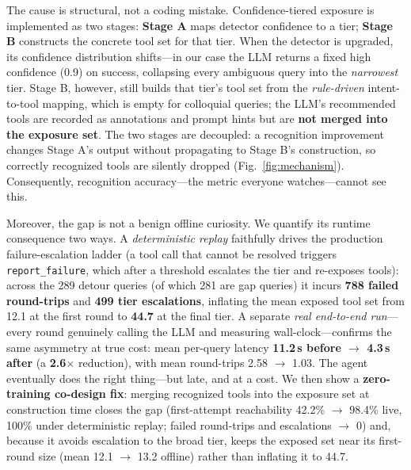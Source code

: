 The cause is structural, not a coding mistake. Confidence-tiered exposure is implemented as two stages: \textbf{Stage A} maps detector confidence to a tier; \textbf{Stage B} constructs the concrete tool set for that tier. When the detector is upgraded, its confidence distribution shifts---in our case the LLM returns a fixed high confidence (0.9) on success, collapsing every ambiguous query into the \emph{narrowest} tier. Stage B, however, still builds that tier's tool set from the \emph{rule-driven} intent-to-tool mapping, which is empty for colloquial queries; the LLM's recommended tools are recorded as annotations and prompt hints but are \textbf{not merged into the exposure set}. The two stages are decoupled: a recognition improvement changes Stage A's output without propagating to Stage B's construction, so correctly recognized tools are silently dropped (Fig.~\ref{fig:mechanism}). Consequently, recognition accuracy---the metric everyone watches---cannot see this.

Moreover, the gap is not a benign offline curiosity. We quantify its runtime consequence two ways. A \emph{deterministic replay} faithfully drives the production failure-escalation ladder (a tool call that cannot be resolved triggers \texttt{report\_failure}, which after a threshold escalates the tier and re-exposes tools): across the 289 detour queries (of which 281 are gap queries) it incurs \textbf{788 failed round-trips} and \textbf{499 tier escalations}, inflating the mean exposed tool set from 12.1 at the first round to \textbf{44.7} at the final tier. A separate \emph{real end-to-end run}---every round genuinely calling the LLM and measuring wall-clock---confirms the same asymmetry at true cost: mean per-query latency \textbf{11.2\,s before $\rightarrow$ 4.3\,s after} (a \textbf{2.6$\times$} reduction), with mean round-trips 2.58 $\rightarrow$ 1.03. The agent eventually does the right thing---but late, and at a cost. We then show a \textbf{zero-training co-design fix}: merging recognized tools into the exposure set at construction time closes the gap (first-attempt reachability 42.2\% $\rightarrow$ 98.4\% live, 100\% under deterministic replay; failed round-trips and escalations $\rightarrow$ 0) and, because it avoids escalation to the broad tier, keeps the exposed set near its first-round size (mean 12.1 $\rightarrow$ 13.2 offline) rather than inflating it to 44.7.

